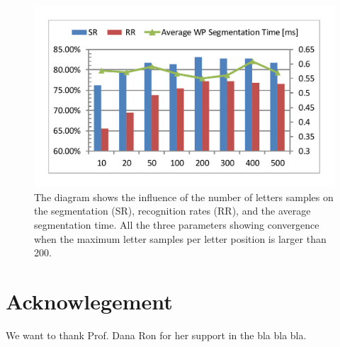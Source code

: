 \documentclass[10pt, conference, compsocconf]{IEEEtran}
\begin{document}
\begin{figure}
\centering
\includegraphics[width=0.9\columnwidth]{./figures/num_letter_impact}
\caption{The diagram shows the influence of the number of letters samples on the segmentation (SR), recognition rates (RR), and the average segmentation time. All the three parameters showing convergence when the maximum letter samples per letter position is larger than 200. }
\label{fig:num_letter_impact}
\end{figure}

\section{Acknowlegement}
{\color{blue}We want to thank Prof. Dana Ron for her support in the bla bla bla.}


\end{document}
